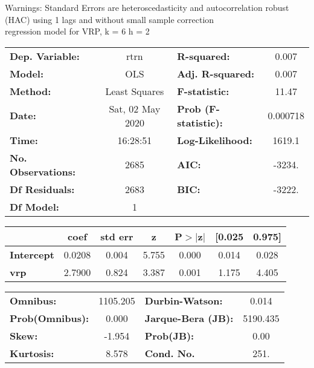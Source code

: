 Warnings: \newline
 [1] Standard Errors are heteroscedasticity and autocorrelation robust (HAC) using 1 lags and without small sample correction\\ 

regression model for VRP, k = 6 h = 2\begin{center}
\begin{tabular}{lclc}
\toprule
\textbf{Dep. Variable:}    &       rtrn       & \textbf{  R-squared:         } &     0.007   \\
\textbf{Model:}            &       OLS        & \textbf{  Adj. R-squared:    } &     0.007   \\
\textbf{Method:}           &  Least Squares   & \textbf{  F-statistic:       } &     11.47   \\
\textbf{Date:}             & Sat, 02 May 2020 & \textbf{  Prob (F-statistic):} &  0.000718   \\
\textbf{Time:}             &     16:28:51     & \textbf{  Log-Likelihood:    } &    1619.1   \\
\textbf{No. Observations:} &        2685      & \textbf{  AIC:               } &    -3234.   \\
\textbf{Df Residuals:}     &        2683      & \textbf{  BIC:               } &    -3222.   \\
\textbf{Df Model:}         &           1      & \textbf{                     } &             \\
\bottomrule
\end{tabular}
\begin{tabular}{lcccccc}
                   & \textbf{coef} & \textbf{std err} & \textbf{z} & \textbf{P$> |$z$|$} & \textbf{[0.025} & \textbf{0.975]}  \\
\midrule
\textbf{Intercept} &       0.0208  &        0.004     &     5.755  &         0.000        &        0.014    &        0.028     \\
\textbf{vrp}       &       2.7900  &        0.824     &     3.387  &         0.001        &        1.175    &        4.405     \\
\bottomrule
\end{tabular}
\begin{tabular}{lclc}
\textbf{Omnibus:}       & 1105.205 & \textbf{  Durbin-Watson:     } &    0.014  \\
\textbf{Prob(Omnibus):} &   0.000  & \textbf{  Jarque-Bera (JB):  } & 5190.435  \\
\textbf{Skew:}          &  -1.954  & \textbf{  Prob(JB):          } &     0.00  \\
\textbf{Kurtosis:}      &   8.578  & \textbf{  Cond. No.          } &     251.  \\
\bottomrule
\end{tabular}
\end{center}

